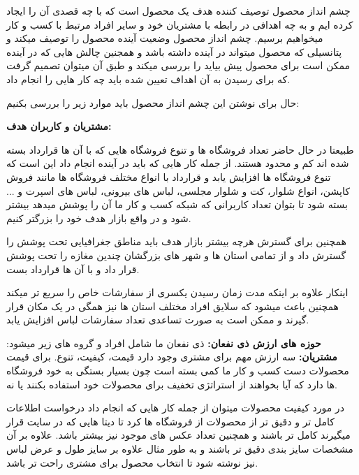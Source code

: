 \documentclass[12pt,a4paper]{article}
\begin{document}
 
\maketitle
\pagebreak
\normalsize	
{\large\textbf{}}


چشم انداز محصول توصیف کننده هدف یک محصول است که با چه قصدی آن را ایجاد کرده ایم و به چه اهدافی در رابطه با مشتریان خود و سایر افراد مرتبط با کسب و کار میخواهیم برسیم. چشم انداز محصول وضعیت آینده محصول را توصیف میکند و پتانسیلی که محصول میتواند در آینده داشته باشد و همجنین چالش هایی که در آینده ممکن است برای محصول پیش بیاید را بررسی میکند و طبق آن میتوان تصمیم گرفت که برای رسیدن به آن اهداف تعیین شده باید چه کار هایی را انجام داد.	
	
	
حال برای نوشتن این چشم انداز محصول باید موارد زیر را بررسی بکنیم:

	
\textbf{مشتریان و کاربران هدف:}


طبیعتا در حال حاضر تعداد فروشگاه ها و تنوع فروشگاه هایی که با آن ها قرارداد بسته شده اند کم و محدود هستند. از جمله کار هایی که باید در آینده انجام داد این است که تنوع فروشگاه ها افزایش یابد و قرارداد با انواع مختلف فروشگاه ها مانند فروش کاپشن، انواع شلوار، کت و شلوار مجلسی، لباس های بیرونی، لباس های اسپرت و ... بسته شود تا بتوان تعداد کاربرانی که شبکه کسب و کار ما آن را پوشش میدهد بیشتر شود و در واقع بازار هدف خود را بزرگتر کنیم.


همچنین برای گسترش هرچه بیشتر بازار هدف باید مناطق جغرافیایی تحت پوشش را گسترش داد و از تمامی استان ها و شهر های بزرگشان چندین مغازه را تحت پوشش قرار داد و با آن ها قرارداد بست.


اینکار علاوه بر اینکه مدت زمان رسیدن یکسری از سفارشات خاص را سریع تر میکند همچنین باعث میشود که سلایق افراد مختلف استان ها نیز همگی در یک مکان قرار گیرند و ممکن است به صورت تساعدی تعداد سفارشات لباس افزایش یابد.


\textbf{حوزه های ارزش ذی نفعان:}
	ذی نفعان ما شامل افراد و گروه های زیر میشود:
	\textbf{مشتریان: }سه ارزش مهم برای مشتری وجود دارد قیمت، کیفیت، تنوع. برای قیمت محصولات دست کسب و کار ما کمی بسته است چون بسیار بستگی به خود فروشگاه ها دارد که آیا بخواهند از استراتژی تخفیف برای محصولات خود استفاده بکنند یا نه.
	
	
	در مورد کیفیت محصولات میتوان از جمله کار هایی که انجام داد درخواست اطلاعات کامل تر و دقیق تر از محصولات از فروشگاه ها کرد تا دیتا هایی که در سایت قرار میگیرند کامل تر باشند و همچنین تعداد عکس های موجود نیز بیشتر باشد. علاوه بر آن مشخصات سایز بندی دقیق تر باشند و به طور مثال علاوه بر سایز طول و عرض لباس نیز نوشته شود تا انتخاب محصول برای مشتری راحت تر باشد.
	
\end{document}
